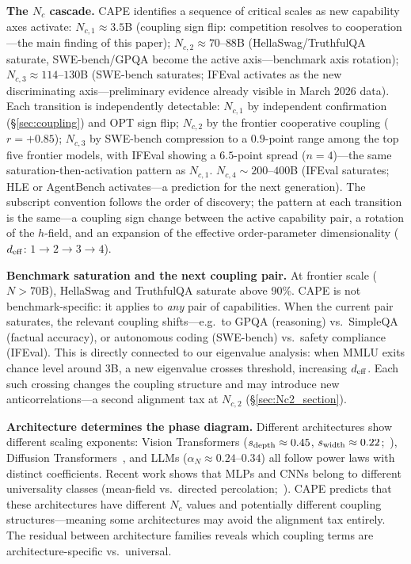 \documentclass[11pt]{article}
\begin{document}
\textbf{The $N_c$ cascade.}
CAPE identifies a sequence of critical scales as new capability axes activate:
$N_{c,1} \approx 3.5$B (coupling sign flip: competition resolves to cooperation---the main finding of this paper);
$N_{c,2} \approx 70$--$88$B (HellaSwag/TruthfulQA saturate, SWE-bench/GPQA become the active axis---benchmark axis rotation);
$N_{c,3} \approx 114$--$130$B (SWE-bench saturates; IFEval activates as the new discriminating axis---preliminary evidence already visible in March 2026 data).
Each transition is independently detectable: $N_{c,1}$ by independent confirmation (\S\ref{sec:coupling}) and OPT sign flip; $N_{c,2}$ by the frontier cooperative coupling ($r=+0.85$); $N_{c,3}$ by SWE-bench compression to a $0.9$-point range among the top five frontier models, with IFEval showing a $6.5$-point spread ($n=4$)---the same saturation-then-activation pattern as $N_{c,1}$.
$N_{c,4} \sim 200$--$400$B (IFEval saturates; HLE or AgentBench activates---a prediction for the next generation).
The subscript convention follows the order of discovery; the pattern at each transition is the same---a coupling sign change between the active capability pair, a rotation of the $h$-field, and an expansion of the effective order-parameter dimensionality ($d_{\rm eff}$: $1 \to 2 \to 3 \to 4$).

\textbf{Benchmark saturation and the next coupling pair.}
At frontier scale ($N > 70$B), HellaSwag and TruthfulQA saturate above 90\%.
CAPE is not benchmark-specific: it applies to \emph{any} pair of
capabilities.
When the current pair saturates, the relevant coupling shifts---e.g.\
to GPQA (reasoning) vs.\ SimpleQA~\cite{simpleqa2024} (factual accuracy), or
autonomous coding (SWE-bench) vs.\ safety compliance (IFEval).
This is directly connected to our eigenvalue analysis:
when MMLU exits chance level around 3B, a new eigenvalue crosses
threshold, increasing $d_{\rm eff}$.
Each such crossing changes the coupling structure and may introduce
new anticorrelations---a second alignment tax at $N_{c,2}$ (\S\ref{sec:Nc2_section}).

\textbf{Architecture determines the phase diagram.}
Different architectures show different scaling exponents:
Vision Transformers ($s_{\rm depth} \approx 0.45$, $s_{\rm width} \approx 0.22$;~\cite{sovitvit2023}),
Diffusion Transformers~\cite{dit_scaling2024}, and LLMs ($\alpha_N \approx 0.24$--$0.34$)
all follow power laws with distinct coefficients.
Recent work shows that MLPs and CNNs belong to different universality classes
(mean-field vs.\ directed percolation;~\cite{inoue2025}).
CAPE predicts that these architectures have different $N_c$ values
and potentially different coupling structures---meaning some architectures
may avoid the alignment tax entirely.
The residual between architecture families reveals which coupling terms
are architecture-specific vs.\ universal.
\end{document}
